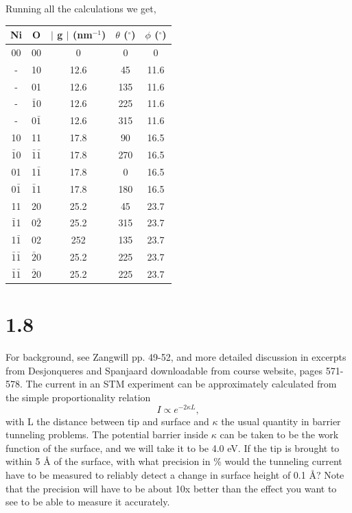 \documentclass[12pt]{article}
\renewcommand{\=}[1]{\stackrel{#1}{=}} %
\theoremstyle{definition}
\theoremstyle{remark}
\begin{document}
Running all the calculations we get,
\begin{center}
 \begin{tabular}{||c c c c c||} 
 \hline
 Ni & O & $\vert$ g $\vert$ (nm$^{-1}$) & $\theta$ ($^\circ$) & $\phi$ ($^\circ$)\\ [0.5ex] 
 \hline\hline
 00 & 00 & 0 & 0 & 0 \\[1ex] 
 - & 10 & 12.6 & 45 & 11.6 \\[1ex] 
 - & 01 & 12.6 & 135 & 11.6 \\[1ex] 
 - & $\bar{1}$0 & 12.6 & 225 & 11.6 \\[1ex] 
 - & 0$\bar{1}$ & 12.6 & 315 & 11.6 \\[1ex] 
 10 & 11 & 17.8 & 90 & 16.5 \\[1ex] 
 $\bar{1}0$ & $\bar{1}\bar{1}$ & 17.8 & 270 & 16.5 \\[1ex] 
 01 & 1$\bar{1}$ & 17.8 & 0 & 16.5 \\[1ex] 
 0$\bar{1}$ & $\bar{1}$1 & 17.8 & 180 & 16.5 \\[1ex] 
 11 & 20 & 25.2 & 45 & 23.7 \\[1ex] 
 $\bar{1}$1 & 0$\bar{2}$ & 25.2 & 315 & 23.7 \\[1ex] 
 1$\bar{1}$ & 02 & 252 & 135 & 23.7 \\[1ex] 
 $\bar{1}\bar{1}$ & $\bar{2}$0 & 25.2 & 225 & 23.7 \\[1ex] 
 $\bar{1}\bar{1}$ & $\bar{2}0$ & 25.2 & 225 & 23.7 \\ [2ex] 
 \hline
\end{tabular}
\end{center}


\newpage
\section*{1.8}
\begin{bclogo}[logo=\bcquestion , barre=none]
\newline
For background, see Zangwill pp. 49-52, and more detailed discussion in excerpts from Desjonqueres and Spanjaard downloadable from course website, pages 571-578.
The current in an STM experiment can be approximately calculated from the simple proportionality relation
\[
	I \propto e^{-2\kappa L},
\]
with L the distance between tip and surface and $\kappa$ the usual quantity in barrier tunneling problems. The potential barrier inside $\kappa$ can be taken to be the work function of the surface, and we will take it to be 4.0 eV.
\vspace{2mm}
\newline
If the tip is brought to within 5 Å of the surface, with what precision in \% would the tunneling current have to be measured to reliably detect a change in surface height of 0.1 Å? Note that the precision will have to be about 10x better than the effect you want to see to be able to measure it accurately.
\end{bclogo}
\vspace{2cm}
\end{document}
